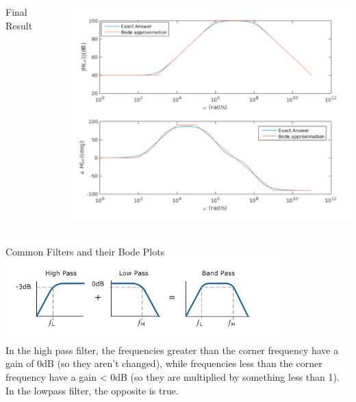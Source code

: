     \begin{frame}{}
        \begin{columns}
            \begin{column}{0.25\textwidth}
                Final Result
            \end{column}
            \begin{column}{0.75\textwidth}
                \includegraphics[scale=0.75]{./images/practice-problem.png}\\
            \end{column}
        \end{columns}
    \end{frame}
    \begin{frame}{Common Filters and their Bode Plots}
        \includegraphics[]{./images/common-filter-bode-plot.png}\\
        In the high pass filter, the frequencies greater than the corner frequency have a gain of 0dB (so they aren’t changed), while frequencies less than the corner frequency have a gain < 0dB (so they are multiplied by something less than 1). \\
        In the lowpass filter, the opposite is true.
    \end{frame}
